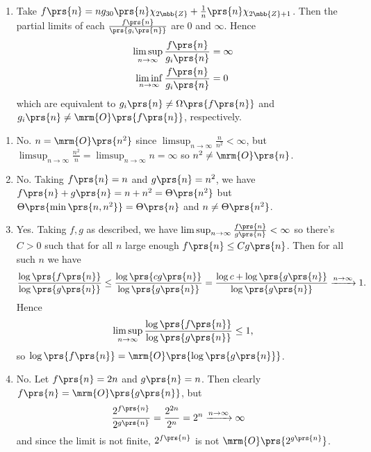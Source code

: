 \documentclass[oneside]{scrbook}
\theoremstyle{definition}
\begin{document}
\begin{problem}
\begin{enumerate}[label=\alph*.]
\item
Take $f\prs{n} = n g_{30}\prs{n} \chi_{2 \mbb{Z}} + \frac{1}{n}\prs{n} \chi_{2 \mbb{Z} + 1}$. Then the partial limits of each $\frac{f\prs{n}}{\prs{g_{i}\prs{n}}}$ are $0$ and $\infty$. Hence
\begin{align*}
\limsup_{n\to\infty} \frac{f\prs{n}}{g_i\prs{n}} &= \infty \\
\liminf_{n\to\infty} \frac{f\prs{n}}{g_i\prs{n}} &= 0
\end{align*}
which are equivalent to $g_i\prs{n} \neq \Omega\prs{f\prs{n}}$ and $g_i\prs{n} \neq \mrm{O}\prs{f\prs{n}}$, respectively.
\end{enumerate}
\end{problem}

\begin{problem}
\begin{enumerate}[label=\alph*.]
\item No. $n = \mrm{O}\prs{n^2}$ since $\limsup_{n \to \infty} \frac{n}{n^2} < \infty$, but $\limsup_{n \to \infty} \frac{n^2}{n} = \limsup_{n\to\infty} n = \infty$ so $n^2 \neq \mrm{O}\prs{n}$.
\item No. Taking $f\prs{n} = n$ and $g\prs{n} = n^2$, we have $f\prs{n} + g\prs{n} = n + n^2 = \Theta\prs{n^2}$ but $\Theta\prs{\min\prs{n,n^2}} = \Theta\prs{n}$ and $n \neq \Theta\prs{n^2}$.
\item Yes. Taking $f,g$ as described, we have $\limsup_{n\to\infty} \frac{f\prs{n}}{g\prs{n}} < \infty$ so there's $C > 0$ such that for all $n$ large enough $f\prs{n} \leq C g\prs{n}$. Then for all such $n$ we have
\begin{align*}
\frac{\log\prs{f\prs{n}}}{\log\prs{g\prs{n}}} \leq \frac{\log \prs{c g\prs{n}}}{\log\prs{g\prs{n}}} = \frac{\log c + \log\prs{g\prs{n}}}{\log \prs{g\prs{n}}} \xrightarrow{n\to\infty} 1 \text{.}
\end{align*}
Hence
\begin{align*}
\limsup_{n\to\infty} \frac{\log\prs{f\prs{n}}}{\log\prs{g\prs{n}}} \leq 1 \text{,}
\end{align*}
so $\log\prs{f\prs{n}} = \mrm{O}\prs{\log\prs{g\prs{n}}}$.
\item \label{item:counter-example}
No. Let $f\prs{n} = 2n$ and $g\prs{n} = n$. Then clearly $f\prs{n} = \mrm{O}\prs{g\prs{n}}$, but
\begin{align*}
    \frac{2^{f\prs{n}}}{2^{g\prs{n}}} &= \frac{2^{2n}}{2^n} = 2^n \xrightarrow{n\to\infty} \infty
\end{align*}
and since the limit is not finite, $2^{f\prs{n}}$ is not $\mrm{O}\prs{2^{g\prs{n}}}$.

\end{enumerate}
\end{problem}
\end{document}
